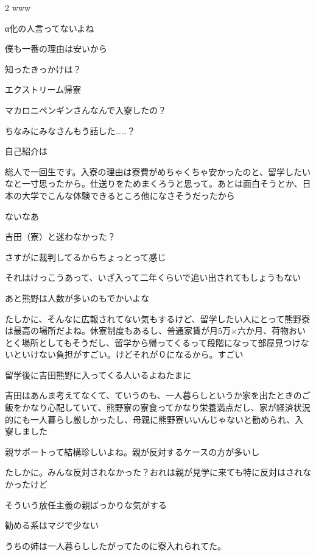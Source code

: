\begin{multicols}{2}
 www

 α化の人言ってないよね

 僕も一番の理由は安いから

 知ったきっかけは？

 エクストリーム帰寮

 マカロニペンギンさんなんで入寮したの？

 ちなみにみなさんもう話した……？

 自己紹介は

 総人で一回生です。入寮の理由は寮費がめちゃくちゃ安かったのと、留学したいなと一寸思ったから。仕送りをためまくろうと思って。あとは面白そうとか、日本の大学でこんな体験できるところ他になさそうだったから

 ないなあ

 吉田（寮）と迷わなかった？

 さすがに裁判してるからちょっとって感じ

 それはけっこうあって、いざ入って二年くらいで追い出されてもしょうもない

 あと熊野は人数が多いのもでかいよな

 たしかに、そんなに広報されてない気もするけど、留学したい人にとって熊野寮は最高の場所だよね。休寮制度もあるし、普通家賃が月5万×六か月、荷物おいとく場所としてもそうだし、留学から帰ってくるって段階になって部屋見つけないといけない負担がすごい。けどそれが０になるから。すごい

 留学後に吉田熊野に入ってくる人いるよねたまに

 吉田はあんま考えてなくて、ていうのも、一人暮らしというか家を出たときのご飯をかなり心配していて、熊野寮の寮食ってかなり栄養満点だし、家が経済状況的にも一人暮らし厳しかったし、母親に熊野寮いいんじゃないと勧められ、入寮しました

 親サポートって結構珍しいよね。親が反対するケースの方が多いし

 たしかに。みんな反対されなかった？おれは親が見学に来ても特に反対はされなかったけど

 そういう放任主義の親ばっかりな気がする

 勧める系はマジで少ない

 うちの姉は一人暮らししたがってたのに寮入れられてた。


\end{multicols}
